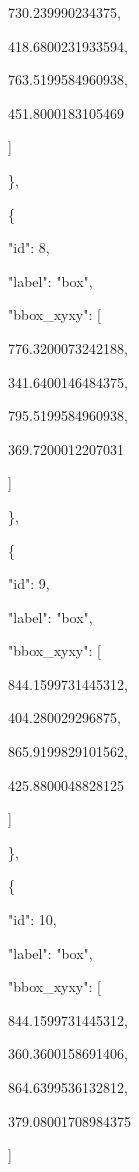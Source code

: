 \documentclass[10pt,a4paper]{article}
\begin{document}
        730.239990234375,\allowbreak{}\par
        418.6800231933594,\allowbreak{}\par
        763.5199584960938,\allowbreak{}\par
        451.8000183105469\par
      ]\par
    \},\allowbreak{}\par
    \{\par
      "id":\allowbreak{} 8,\allowbreak{}\par
      "label":\allowbreak{} "box",\allowbreak{}\par
      "bbox\_xyxy":\allowbreak{} [\par
        776.3200073242188,\allowbreak{}\par
        341.6400146484375,\allowbreak{}\par
        795.5199584960938,\allowbreak{}\par
        369.7200012207031\par
      ]\par
    \},\allowbreak{}\par
    \{\par
      "id":\allowbreak{} 9,\allowbreak{}\par
      "label":\allowbreak{} "box",\allowbreak{}\par
      "bbox\_xyxy":\allowbreak{} [\par
        844.1599731445312,\allowbreak{}\par
        404.280029296875,\allowbreak{}\par
        865.9199829101562,\allowbreak{}\par
        425.8800048828125\par
      ]\par
    \},\allowbreak{}\par
    \{\par
      "id":\allowbreak{} 10,\allowbreak{}\par
      "label":\allowbreak{} "box",\allowbreak{}\par
      "bbox\_xyxy":\allowbreak{} [\par
        844.1599731445312,\allowbreak{}\par
        360.3600158691406,\allowbreak{}\par
        864.6399536132812,\allowbreak{}\par
        379.08001708984375\par
      ]\par
\end{document}
